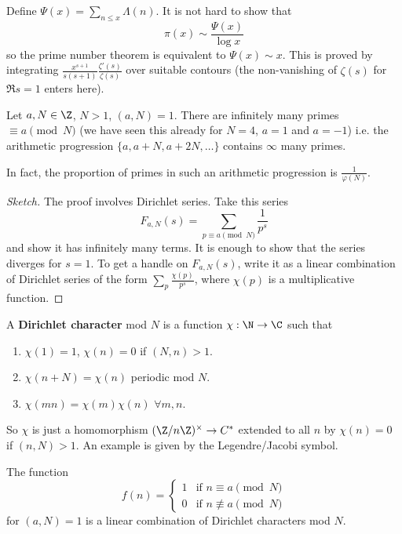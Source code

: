 \documentclass{article}
\begin{document}
Define $\Psi(x) = \sum_{n \leq x} \Lambda(n)$.
It is not hard to show that
\begin{equation*}
    \pi(x) \sim \frac{\Psi(x)}{\log x}
\end{equation*}
so the prime number theorem is equivalent to $\Psi(x) \sim x$.
This is proved by integrating $\frac{x^{s+1}}{s(s+1)} \frac{\zeta'(s)}{\zeta(s)}$ over suitable contours (the non-vanishing of $\zeta(s)$ for $\Re s = 1$ enters here).

\begin{thm}
    Let $a, N \in \Z$, $N > 1$, $(a,N)=1$.
    There are infinitely many primes $\equiv a \pmod{N}$ (we have seen this already for $N=4$, $a=1$ and $a=-1$) i.e. the arithmetic progression $\{a, a + N, a + 2N, \dotsc\}$ contains $\infty$ many primes.
\end{thm}

In fact, the proportion of primes in such an arithmetic progression is $\frac{1}{\varphi(N)}$.
\begin{proof}[Sketch]
    The proof involves Dirichlet series. Take this series
    \begin{equation*}
        F_{a,N}(s) = \sum_{p \equiv a \pmod{N}} \frac{1}{p^s}
    \end{equation*}
    and show it has infinitely many terms. It is enough to show that the series diverges for $s=1$.
    To get a handle on $F_{a,N}(s)$, write it as a linear combination of Dirichlet series of the form $\sum_p \frac{\chi(p)}{p^s}$, where $\chi(p)$ is a multiplicative function.
\end{proof}

\begin{defi}
    A \textbf{Dirichlet character} mod $N$ is a function $\chi: \N \to \C$ such that
    \begin{enumerate}[label=(\roman*)]
        \item $\chi(1)=1$, $\chi(n) = 0$ if $(N, n) > 1$.
        \item $\chi(n+N) = \chi(n)$ periodic mod $N$.
        \item $\chi(mn) = \chi(m)\chi(n)$ $\forall m,n$.
    \end{enumerate}
\end{defi}
So $\chi$ is just a homomorphism $(\Z/n\Z)^\times \to C^*$ extended to all $n$ by $\chi(n) = 0$ if $(n, N)>1$.
An example is given by the Legendre/Jacobi symbol.

\begin{fact}
    The function
    \begin{equation*}
        f(n) =
        \begin{cases}
            1 & \text{if } n\equiv a \pmod{N} \\
            0 & \text{if } n\not\equiv a \pmod{N}
        \end{cases}
    \end{equation*}
    for $(a,N)=1$ is a linear combination of Dirichlet characters mod $N$.
\end{fact}
\end{document}
